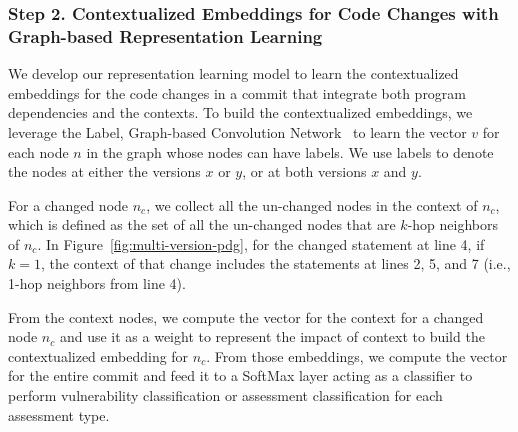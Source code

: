 




\vspace{2pt}
\subsubsection*{{\bf Step 2. Contextualized Embeddings for Code Changes with
Graph-based Representation Learning}} We develop our representation
learning model to learn the contextualized embeddings for the code
changes in a commit that integrate both program dependencies and the
contexts. To build the contextualized embeddings, we leverage the
Label, Graph-based Convolution Network~\cite{label-gcn} to learn the
vector $v$ for each node $n$ in the graph whose nodes can have
labels. We use labels to denote the nodes at either the versions $x$ or
$y$, or at both versions $x$ and $y$.

For a changed node $n_c$, we collect all the un-changed nodes in the
context of $n_c$, which is defined as the set of all the un-changed
nodes that are $k$-hop neighbors of $n_c$. In
Figure~\ref{fig:multi-version-pdg}, for the changed statement at line
4, if $k=1$, the context of that change includes the statements at
lines 2, 5, and 7 (i.e., 1-hop neighbors from line 4).

From the context nodes, we compute the vector for the context
for a changed node $n_c$ and use it as a weight to represent the
impact of context to build the contextualized embedding for $n_c$.
From those embeddings, we compute the vector for the entire
commit and feed it to a SoftMax layer acting as
a classifier to perform vulnerability classification or assessment
classification for each assessment type.



